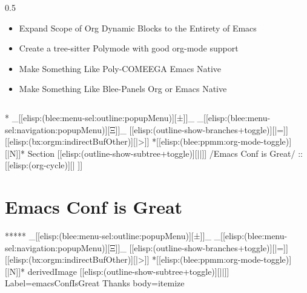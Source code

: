 \begin{whenOrg}
\begin{verblatex}
\begin{frame}[fragile,plain,label=yourParticipation]
\begin{columns}
      \begin{column}{0.5\textwidth}

        \begin{itemize}
          \item Expand Scope of Org Dynamic Blocks to the Entirety of Emacs
          \item Create a tree-sitter Polymode with good org-mode support
          \item Make Something Like Poly-COMEEGA Emacs Native
          \item Make Something Like Blee-Panels Org or Emacs Native
        \end{itemize}
      \end{column}

    \end{columns}




\end{frame}
\end{verblatex}



\begin{whenOrg}
*  _[[elisp:(blee:menu-sel:outline:popupMenu)][±]]_ _[[elisp:(blee:menu-sel:navigation:popupMenu)][Ξ]]_ [[elisp:(outline-show-branches+toggle)][|=]] [[elisp:(bx:orgm:indirectBufOther)][|>]] *[[elisp:(blee:ppmm:org-mode-toggle)][|N]]*  Section    [[elisp:(outline-show-subtree+toggle)][||]]   /Emacs Conf is Great/ ::  [[elisp:(org-cycle)][| ]]
\end{whenOrg}

\section{Emacs Conf is Great}

\begin{whenOrg}
*****  _[[elisp:(blee:menu-sel:outline:popupMenu)][±]]_ _[[elisp:(blee:menu-sel:navigation:popupMenu)][Ξ]]_ [[elisp:(outline-show-branches+toggle)][|=]] [[elisp:(bx:orgm:indirectBufOther)][|>]] *[[elisp:(blee:ppmm:org-mode-toggle)][|N]]*  derivedImage [[elisp:(outline-show-subtree+toggle)][||]] Label=emacsConfIsGreat Thanks body=itemize
\end{whenOrg}


\end{whenOrg}
